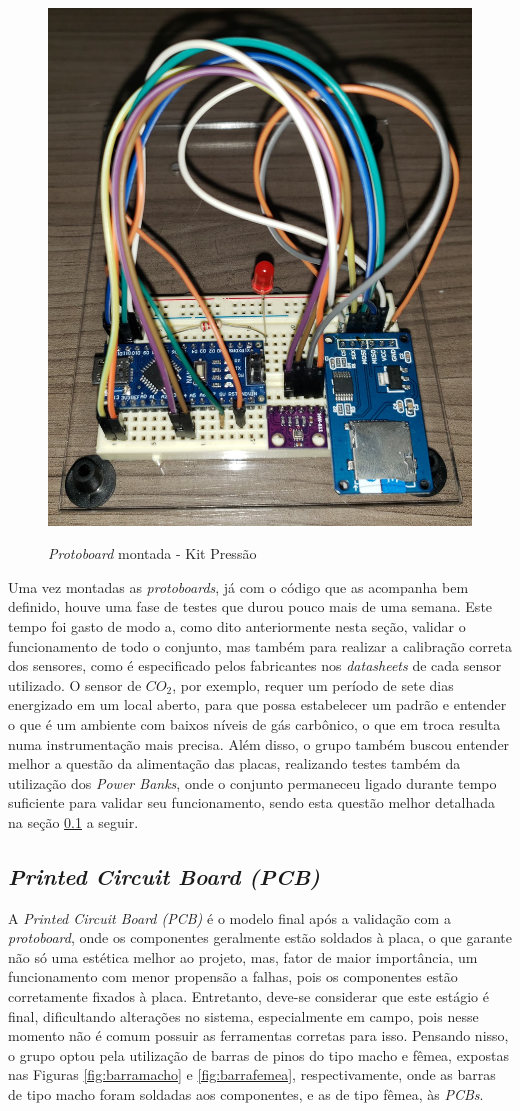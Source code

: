 \documentclass[acronym,symbols,table]{fei}
\begin{document}
\begin{figure}[!htb]
\centering
    \caption{\textit{Protoboard} montada - Kit Pressão}
    \includegraphics[width=0.45\linewidth]{Imagens/protoboardpressao.jpeg}
    \label{fig:protopressao}
\end{figure}
\newpage
Uma vez montadas as \textit{protoboards}, já com o código que as acompanha bem definido, houve uma fase de testes que durou pouco mais de uma semana. Este tempo foi gasto de modo a, como dito anteriormente nesta seção, validar o funcionamento de todo o conjunto, mas também para realizar a calibração correta dos sensores, como é especificado pelos fabricantes nos \textit{datasheets} de cada sensor utilizado. O sensor de ${CO}_{2}$, por exemplo, requer um período de sete dias energizado em um local aberto, para que possa estabelecer um padrão e entender o que é um ambiente com baixos níveis de gás carbônico, o que em troca resulta numa instrumentação mais precisa. Além disso, o grupo também buscou entender melhor a questão da alimentação das placas, realizando testes também da utilização dos \textit{Power Banks}, onde o conjunto permaneceu ligado durante tempo suficiente para validar seu funcionamento, sendo esta questão melhor detalhada na seção \ref{PCB} a seguir.


\subsection{\textit{Printed Circuit Board (PCB)}} \label{PCB}

A \textit{Printed Circuit Board (PCB)} é o modelo final após a validação com a \textit{protoboard}, onde os componentes geralmente estão soldados à placa, o que garante não só uma estética melhor ao projeto, mas, fator de maior importância, um funcionamento com menor propensão a falhas, pois os componentes estão corretamente fixados à placa. Entretanto, deve-se considerar que este estágio é final, dificultando alterações no sistema, especialmente em campo, pois nesse momento não é comum possuir as ferramentas corretas para isso. Pensando nisso, o grupo optou pela utilização de barras de pinos do tipo macho e fêmea, expostas nas Figuras \ref{fig:barramacho} e \ref{fig:barrafemea}, respectivamente, onde as barras de tipo macho foram soldadas aos componentes, e as de tipo fêmea, às \textit{PCBs}.
\end{document}
